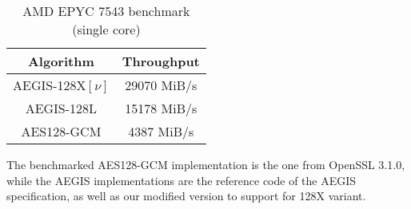 \documentclass[envcountsame,runningheads,notitlepage]{llncs}
\begin{document}
\begin{table}
  \begin{center}
    \begin{tabular}{|c|c|}
      \hline
      Algorithm         & Throughput  \\
      \hline
      AEGIS-128X$[\nu]$ & 29070 MiB/s \\
      \hline
      AEGIS-128L        & 15178 MiB/s \\
      \hline
      AES128-GCM        & 4387 MiB/s  \\
      \hline
    \end{tabular}
    \caption{\label{epyc-7543}AMD EPYC 7543 benchmark (single core)}
  \end{center}
\end{table}

The benchmarked AES128-GCM implementation is the one from OpenSSL 3.1.0, while the AEGIS implementations are the reference code of the AEGIS specification, as well as our modified version to support for 128X variant.

\ifnum{}
  
\else
  
\fi

\end{document}
